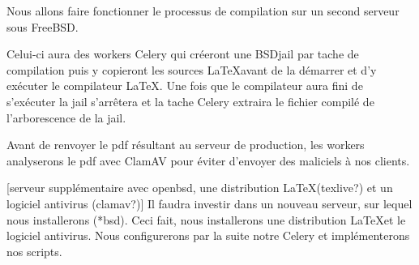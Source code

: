 \documentclass[10pt,a4paper]{article}
\begin{document}
Nous allons faire fonctionner le processus de compilation sur un second serveur sous FreeBSD.

Celui-ci aura des workers Celery qui créeront une BSDjail par tache de compilation puis y copieront les sources \LaTeX avant de la démarrer et d'y exécuter le compilateur \LaTeX.
Une fois que le compilateur aura fini de s'exécuter la jail s'arrêtera et la tache Celery extraira le fichier compilé de l'arborescence de la jail.

Avant de renvoyer le pdf résultant au serveur de production, les workers analyserons le pdf avec ClamAV pour éviter d'envoyer des maliciels à nos clients.

[serveur supplémentaire avec openbsd, une distribution \LaTeX (texlive?) et un logiciel antivirus (clamav?)]
Il faudra investir dans un nouveau serveur, sur lequel nous installerons (*bsd).
Ceci fait, nous installerons une distribution \LaTeX et le logiciel antivirus.
Nous configurerons par la suite notre Celery et implémenterons nos scripts.
\end{document}
